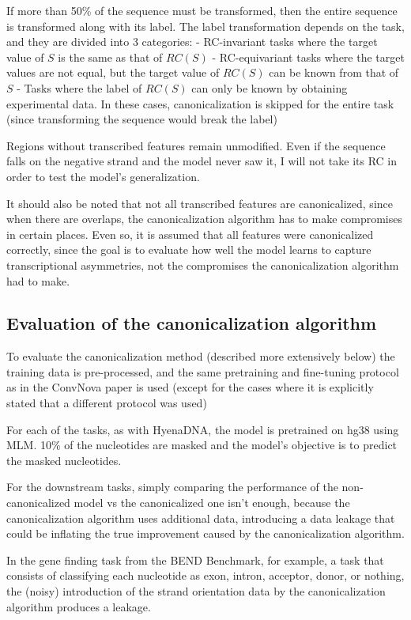 \documentclass[   ]{article}
\begin{document}
If more than 50\% of the sequence must be transformed, then the entire
sequence is transformed along with its label. The label transformation
depends on the task, and they are divided into 3 categories: -
RC-invariant tasks where the target value of \(S\) is the same as that
of \(RC(S)\) - RC-equivariant tasks where the target values are not
equal, but the target value of \(RC(S)\) can be known from that of \(S\)
- Tasks where the label of \(RC(S)\) can only be known by obtaining
experimental data. In these cases, canonicalization is skipped for the
entire task (since transforming the sequence would break the label)

Regions without transcribed features remain unmodified. Even if the
sequence falls on the negative strand and the model never saw it, I will
not take its RC in order to test the model's generalization.

It should also be noted that not all transcribed features are
canonicalized, since when there are overlaps, the canonicalization
algorithm has to make compromises in certain places. Even so, it is
assumed that all features were canonicalized correctly, since the goal
is to evaluate how well the model learns to capture transcriptional
asymmetries, not the compromises the canonicalization algorithm had to
make.

\subsection{Evaluation of the canonicalization algorithm}
\label{sec:evaluation_canonicalizaiton_algorithms}

To evaluate the canonicalization method (described more extensively below) the training data is
pre-processed, and the same pretraining and fine-tuning protocol as
in the ConvNova paper is used (except for the cases where it is
explicitly stated that a different protocol was used)

For each of the tasks, as with HyenaDNA, the model is pretrained on hg38
using MLM. 10\% of the nucleotides are masked and the model's objective
is to predict the masked nucleotides.

For the downstream tasks, simply comparing the performance of the non-canonicalized model vs the canonicalized one isn't enough, because the canonicalization algorithm uses additional data, introducing a data leakage that could be inflating the true improvement caused by the canonicalization algorithm.

In the gene finding task from the BEND Benchmark, for example, a task that
consists of classifying each nucleotide as exon, intron, acceptor,
donor, or nothing, the (noisy) introduction of the strand orientation data by the canonicalization algorithm produces a leakage.
\end{document}
